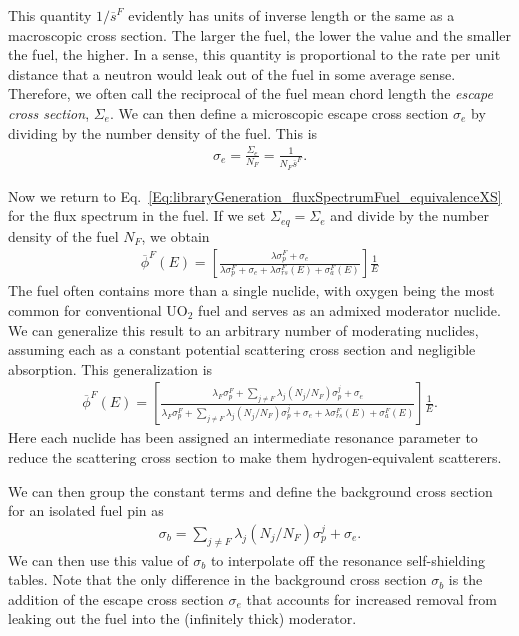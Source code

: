 This quantity $1/\overline{s}^F$ evidently has units of inverse length or the same as a macroscopic cross section. The larger the fuel, the lower the value and the smaller the fuel, the higher. In a sense, this quantity is proportional to the rate per unit distance that a neutron would leak out of the fuel in some average sense. Therefore, we often call the reciprocal of the fuel mean chord length the \emph{escape cross section}, $\Sigma_e$. We can then define a microscopic escape cross section $\sigma_e$ by dividing by the number density of the fuel. This is
\begin{align}
  \sigma_e = \frac{\Sigma_e}{N_F} = \frac{1}{N_F \overline{s}^F} .
\end{align}

Now we return to Eq.~\eqref{Eq:libraryGeneration_fluxSpectrumFuel_equivalenceXS} for the flux spectrum in the fuel. If we set $\Sigma_{eq} = \Sigma_e$ and divide by the number density of the fuel $N_F$, we obtain
\begin{align}
   \overline{\phi}^F(E) = \left[ \frac{ \lambda \sigma_p^F + \sigma_e }{ \lambda \sigma_p^F + \sigma_e + \lambda \sigma_{rs}^F(E) +  \sigma_a^F(E) } \right] \frac{1}{E} 
\end{align}
The fuel often contains more than a single nuclide, with oxygen being the most common for conventional UO$_2$ fuel and serves as an admixed moderator nuclide. We can generalize this result to an arbitrary number of moderating nuclides, assuming each as a constant potential scattering cross section and negligible absorption. This generalization is
\begin{align}
  \overline{\phi}^F(E) = \left[ \frac{ \lambda_F \sigma_p^F + \displaystyle\sum_{j \ne F} \lambda_j ( N_j / N_F ) \sigma_p^j + \sigma_e }{ \lambda_F \sigma_p^F + \displaystyle\sum_{j \ne F} \lambda_j ( N_j / N_F ) \sigma_p^j + \sigma_e + \lambda \sigma_{rs}^F(E) +  \sigma_a^F(E) } \right] \frac{1}{E} .
\end{align}
Here each nuclide has been assigned an intermediate resonance parameter to reduce the scattering cross section to make them hydrogen-equivalent scatterers. 

We can then group the constant terms and define the background cross section for an isolated fuel pin as
\begin{align}
  \sigma_b = \displaystyle\sum_{j \ne F} \lambda_j ( N_j / N_F ) \sigma_p^j + \sigma_e .
\end{align}
We can then use this value of $\sigma_b$ to interpolate off the resonance self-shielding tables. Note that the only difference in the background cross section $\sigma_b$ is the addition of the escape cross section $\sigma_e$ that accounts for increased removal from leaking out the fuel into the (infinitely thick) moderator.

